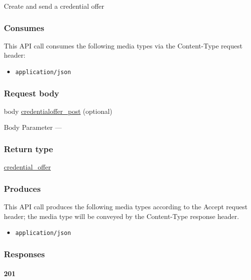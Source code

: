 Create and send a credential offer

\hypertarget{consumes-21}{%
\subsubsection{Consumes}\label{consumes-21}}

This API call consumes the following media types via the {Content-Type}
request header:

\begin{itemize}
\tightlist
\item
  \texttt{application/json}
\end{itemize}

\hypertarget{request-body-21}{%
\subsubsection{Request body}\label{request-body-21}}

body \protect\hyperlink{credentialoffer_post}{credentialoffer\_post}
(optional)

{Body Parameter} ---

\hypertarget{return-type-54}{%
\subsubsection{Return type}\label{return-type-54}}

\protect\hyperlink{credential_offer}{credential\_offer}

\hypertarget{produces-67}{%
\subsubsection{Produces}\label{produces-67}}

This API call produces the following media types according to the
{Accept} request header; the media type will be conveyed by the
{Content-Type} response header.

\begin{itemize}
\tightlist
\item
  \texttt{application/json}
\end{itemize}

\hypertarget{responses-67}{%
\subsubsection{Responses}\label{responses-67}}

\hypertarget{section-222}{%
\paragraph{201}\label{section-222}}

